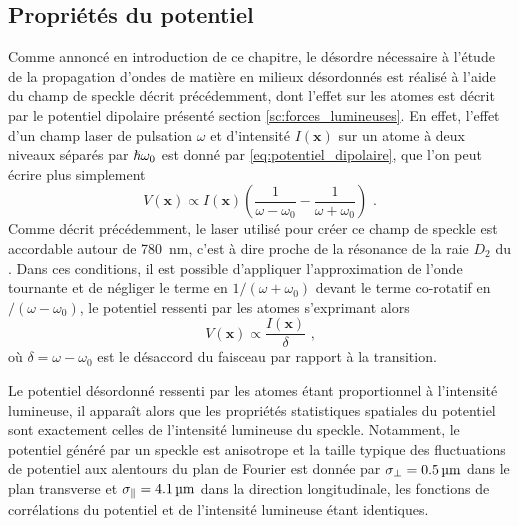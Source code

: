 \subsection{Propriétés du potentiel}
\label{sc:propriete_potentiel_speckle}
Comme annoncé en introduction de ce chapitre, le désordre nécessaire à l'étude de la propagation d'ondes de matière en milieux désordonnés est réalisé à l'aide du champ de speckle décrit précédemment, dont l'effet sur les atomes est décrit par le potentiel dipolaire présenté section \ref{sc:forces_lumineuses}. En effet, l'effet d'un champ laser de pulsation $\omega$ et d'intensité $I(\mathbf{x})$ sur un atome à deux niveaux séparés par $\hslash \omega_0$ est donné par \ref{eq:potentiel_dipolaire}, que l'on peut écrire plus simplement 
\begin{equation}
V(\mathbf{x}) \propto I(\mathbf{x}) \left( \frac{1}{\omega-\omega_0} - \frac{1}{\omega+\omega_0} \right) \text{ .}
\end{equation}
Comme décrit précédemment, le laser utilisé pour créer ce champ de speckle est accordable autour de \SI{780}{\nano\metre}, c'est à dire proche de la résonance de la raie $D_2$ du . Dans ces conditions, il est possible d'appliquer l'approximation de l'onde tournante et de négliger le terme en $1/(\omega+\omega_0)$ devant le terme co-rotatif en $/(\omega-\omega_0)$, le potentiel ressenti par les atomes s'exprimant alors
\begin{equation}
V(\mathbf{x}) \propto \frac{I(\mathbf{x})}{\delta} \text{ ,}
\label{eq:potentiel_dipolaire_approx}
\end{equation}
où $\delta=\omega-\omega_0$ est le désaccord du faisceau par rapport à la transition. 

Le potentiel désordonné ressenti par les atomes étant proportionnel à l'intensité lumineuse, il apparaît alors que les propriétés statistiques spatiales du potentiel sont exactement celles de l'intensité lumineuse du speckle. Notamment, le potentiel généré par un speckle est anisotrope et la taille typique des fluctuations de potentiel aux alentours du plan de Fourier est donnée par $\sigma_{\perp}=\SI{0.5}{\micro\metre}$ dans le plan transverse et $\sigma_{\parallel}=\SI{4.1}{\micro\metre}$ dans la direction longitudinale, les fonctions de corrélations du potentiel et de l'intensité lumineuse étant identiques.

